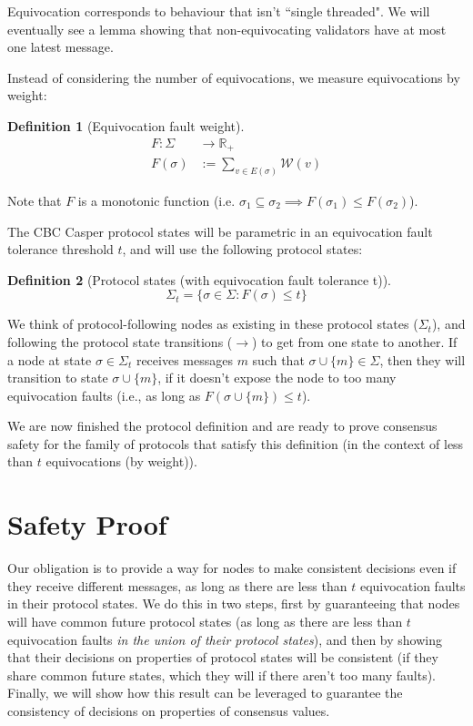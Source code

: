 \documentclass{article}
\theoremstyle{definition}
\newtheorem{defn}{Definition}[section]
\begin{document}
Equivocation corresponds to behaviour that isn't ``single threaded". We will eventually see a lemma showing that non-equivocating validators have at most one latest message.

Instead of considering the number of equivocations, we measure equivocations by weight:

\begin{defn}[Equivocation fault weight]
\begin{align}
F: \Sigma &\to \mathbb{R}_+ \\
F(\sigma) &:= \sum_{v \in E(\sigma)} \mathcal{W}(v)
\end{align}
\end{defn}

Note that $F$ is a monotonic function (i.e. $\sigma_1 \subseteq \sigma_2 \implies F(\sigma_1) \leq F(\sigma_2)$).

The CBC Casper protocol states will be parametric in an equivocation fault tolerance threshold $t$, and will use the following protocol states:

\begin{defn}[Protocol states (with equivocation fault tolerance t)]
$$
\Sigma_t = \{\sigma \in \Sigma : F(\sigma) \leq t\}
$$
\end{defn}

We think of protocol-following nodes as existing in these protocol states ($\Sigma_t$), and following the protocol state transitions ($\to$) to get from one state to another. If a node at state $\sigma \in \Sigma_t$ receives messages $m$ such that $\sigma \cup \{m\} \in \Sigma$, then they will transition to state $\sigma \cup \{m\}$, if it doesn't expose the node to too many equivocation faults (i.e., as long as $F(\sigma \cup \{m\}) \leq t$).

We are now finished the protocol definition and are ready to prove consensus safety for the family of protocols that satisfy this definition (in the context of less than $t$ equivocations (by weight)).


\pagebreak
\section{Safety Proof}

Our obligation is to provide a way for nodes to make consistent decisions even if they receive different messages, as long as there are less than $t$ equivocation faults in their protocol states. We do this in two steps, first by guaranteeing that nodes will have common future protocol states (as long as there are less than $t$ equivocation faults \emph{in the union of their protocol states}), and then by showing that their decisions on properties of protocol states will be consistent (if they share common future states, which they will if there aren't too many faults). Finally, we will show how this result can be leveraged to guarantee the consistency of decisions on properties of consensus values.
\end{document}

